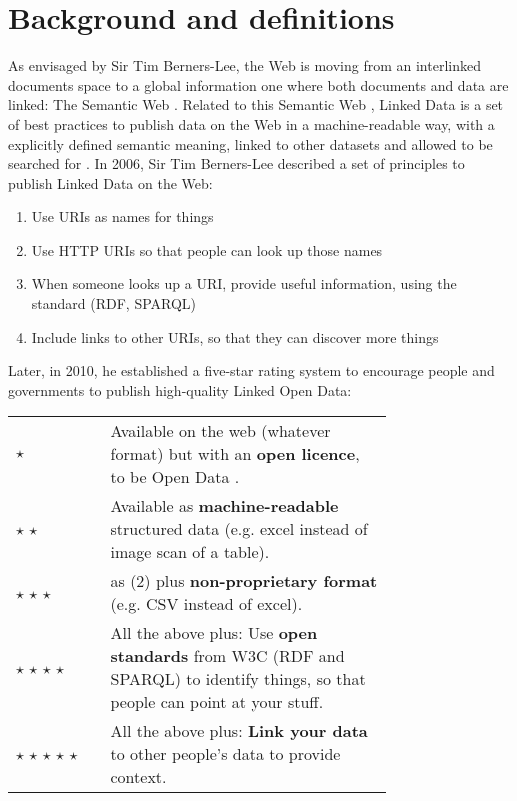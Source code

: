 \section{Background and definitions}
\label{subsec:background}

As envisaged by Sir Tim Berners-Lee, the Web  is moving from an interlinked documents space to a global information one where both documents and data are linked: The Semantic Web \cite{berners2001semantic}. Related to this Semantic Web , Linked Data  is a set of best practices to publish data on the Web in a machine-readable way, with a explicitly defined semantic meaning, linked to other datasets and allowed to be searched for \cite{bizer2009linked}. In 2006, Sir Tim Berners-Lee described a set of principles to publish Linked Data on the Web:

\begin{enumerate}
  \item Use URIs  as names for things
  \item Use HTTP URIs so that people can look up those names
  \item When someone looks up a URI, provide useful information, using the standard (RDF, SPARQL)  
  \item Include links to other URIs, so that they can discover more things \\[\baselineskip]
\end{enumerate}

Later, in 2010, he established a five-star rating system to encourage people and governments to publish high-quality Linked Open Data:\\[\baselineskip]

\begin{tabular}{ l p{0.75\linewidth} }
  $\star$ & Available on the web (whatever format) but with an \textbf{open licence}, to be Open Data \index{{Open Data}}. \\
  $\star$ $\star$ & Available as \textbf{machine-readable} structured data (e.g. excel instead of image scan of a table). \\
  $\star$ $\star$ $\star$ & as (2) plus \textbf{non-proprietary format} (e.g. CSV instead of excel). \\
  $\star$ $\star$ $\star$ $\star$ & All the above plus: Use \textbf{open standards} from W3C (RDF and SPARQL) to identify things, so that people can point at your stuff. \\
  $\star$ $\star$ $\star$ $\star$ $\star$ & All the above plus: \textbf{Link your data} to other people's data to provide context. \\[\baselineskip]
\end{tabular}

